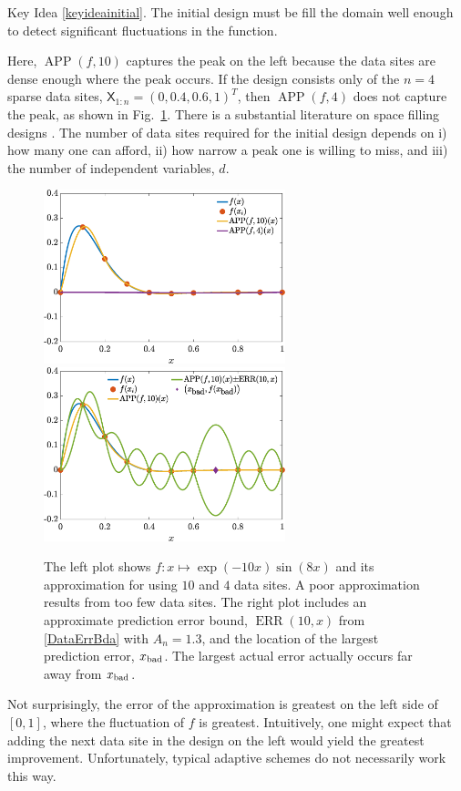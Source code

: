 \documentclass[11pt]{NSFamsart}
\newcommand{\mX}{\mathsf{X}}
\DeclareMathOperator{\APP}{APP}
\DeclareMathOperator{\ERR}{ERR}
\newcommand{\keyideainitialtext}{The initial design must be fill the domain well enough to detect significant fluctuations in the function.}
\newcommand{\repeatkeyidea}[2]{\begin{itshape}Key Idea \ref{#1}. #2\end{itshape}}
\begin{document}
\repeatkeyidea{keyideainitial}{\keyideainitialtext}
Here, $\APP(f,10)$ captures the peak on the left because the data sites are dense enough where the peak occurs.  If the design consists only of the $n=4$ sparse data sites, $\mX_{1:n} = (0, 0.4,  0.6, 1)^T$, then $\APP(f,4)$ does not capture the peak, as shown in Fig.\ \ref{fig:sampleFun}.  There is a substantial literature on space filling designs \cite{FangEtal19a, Jos16a, SanWilNot03}. The number of data sites required for the initial design depends on i) how many one can afford, ii) how narrow a peak one is willing to miss, and iii) the number of independent variables, $d$.

\begin{figure}[H]
    \centering
    \includegraphics[width = 7cm]{ProgramsImages/fandDataAndAppxSmall.eps} \qquad \qquad
    \includegraphics[width = 7cm]{ProgramsImages/fandDataAndAppxAndRMSPE.eps}
    \caption{The left plot shows $f: x \mapsto \exp(-10x) \sin(8x)$ and its approximation for using $10$ and $4$ data sites. A poor approximation results from too few data sites.  The right plot includes an approximate prediction error bound, $\ERR(10,x)$ from \eqref{DataErrBda} with $A_n =1.3$, and the location of the largest prediction error, $x_{\textup{bad}}$. The largest actual error actually occurs far away from $x_{\textup{bad}}$.}
    \label{fig:sampleFun}
\end{figure}

Not surprisingly, the error of the approximation is greatest on the left side of $[0,1]$, where the fluctuation of $f$ is greatest.  Intuitively, one might expect that adding the next data site in the design on the left would yield the greatest improvement.  Unfortunately, typical adaptive schemes do not necessarily work this way.
\end{document}
